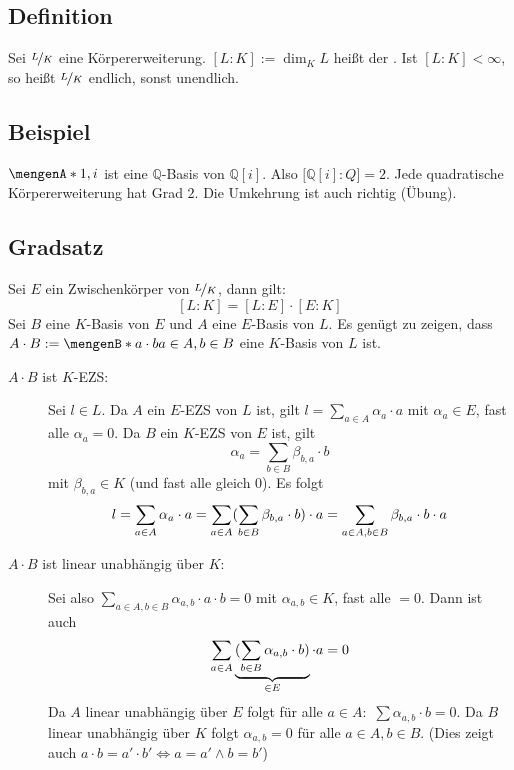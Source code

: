 \subsection[Definition: Grad einer Körpererweiterung]{Definition} %
\label{sub:11.8}
Sei $\nicefrac{L}{K}$ eine Körpererweiterung. $[L:K] := \dim_K L$ heißt der . Ist $[L:K] < \infty$, so heißt
$\nicefrac{L}{K}$ endlich, sonst unendlich.

\subsection[{Beispiel: Grad von $\nicefrac{\mathds{Q}[i]}{\mathds{Q}}$}]{Beispiel} %
\label{sub:11.9}
$\set{1,i}$ ist eine $\mathds{Q}$-Basis von $\mathds{Q}[i]$. Also $\big[\mathds{Q}[i] :Q\big] =2$. Jede quadratische Körpererweiterung hat Grad $2$. Die Umkehrung ist auch 
richtig (Übung).

\subsection{Gradsatz} %
\label{sub:1110}
Sei $E$ ein Zwischenkörper von $\nicefrac{L}{K}$, dann gilt: 
\[
	[L : K] = [L: E] \cdot [E :K]
\]
Sei $B$ eine $K$-Basis von $E$ und $A$ eine $E$-Basis von $L$. Es genügt zu zeigen, dass $A \cdot B := \set[a \cdot b]{a \in A, b \in B} $ eine $K$-Basis von $L$ ist.
\begin{description}
	\item[$A \cdot B$ ist $K$-EZS:] Sei $l \in L$. Da $A$ ein $E$-EZS von $L$ ist, gilt $l = \sum_{a \in A} \alpha_a \cdot a$ mit $\alpha_a \in E$, fast alle $\alpha_a=0$.
	Da $B$ ein $K$-EZS von $E$ ist, gilt
	\[
		\alpha_a = \sum_{b \in B} \beta_{b,a} \cdot b
	\]
	mit $\beta_{b,a} \in K$ (und fast alle gleich 0). Es folgt 
	\[
		l = \sum_{a \in A} \alpha_a \cdot a = \sum_{a \in A} (\sum_{b \in B} \beta_{b,a} \cdot b ) \cdot a = \sum_{a \in A, b \in B}\beta_{b,a} \cdot b \cdot a
	\]
	\item[$A \cdot B$ ist linear unabhängig über $K$:] Sei also $\sum_{a \in A, b \in B}\alpha_{a,b} \cdot a \cdot b =0$ mit $\alpha_{a,b} \in K$, fast alle $=0$. Dann ist
	auch 
	\[
		\sum_{a \in A } \underbrace{( \sum_{b \in B} \alpha_{a,b} \cdot b)}_{\in E} \cdot a = 0 
	\]
	Da $A$ linear unabhängig über $E$ folgt für alle $a \in A:$ $\sum \alpha_{a,b} \cdot b =0$. Da $B$ linear unabhängig über $K$ folgt $\alpha_{a,b}=0$ für alle 
	$a\in A, b \in B$. (Dies zeigt auch $a \cdot  b = a' \cdot b' \iff a=a' \wedge b=b'$) \bewende
\end{description}

